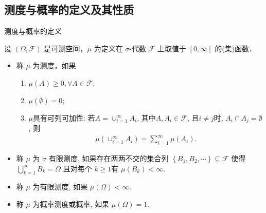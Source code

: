 \documentclass[Prob-All.tex]{subfiles}
\begin{document}










\subsection{测度与概率的定义及其性质}
\begin{frame}{测度与概率的定义}
\begin{defi}
  设 $(\Omega, \mathcal{F})$ 是可测空间，$\mu$ 为定义在 $\sigma$-代数 $\mathcal{F}$ 上取值于 $[0, \infty]$ 的(集)函数．

 \begin{itemize}[<+-|alert@+>]
 \item 称 $\mu$ 为测度，如果
 \begin{enumerate}[<+-|alert@+>][(1)]
			\item $\mu(A)\ge 0, \forall A\in \mathcal{F}$;
			\item $\mu(\emptyset)=0$;
			\item $\mu$具有可列可加性: 若$A=\cup_{i=1}^{\infty}A_i$, 其中$A, A_i\in \mathcal{F}$,  且$i\neq j$时, $A_i\cap A_j=\emptyset$,  则
			\begin{eqnarray*}
				\mu(\cup_{i=1}^{\infty}A_i)=\sum_{i=1}^{\infty}\mu(A_i).
			\end{eqnarray*}

		\end{enumerate}
 \item 称 $\mu$ 为 $\sigma$ 有限测度, 如果存在两两不交的集合列 $\left\{B_{1}, B_{2}, \cdots\right\} \subseteq \mathcal{F}$ 使得 $\bigcup_{k=1}^{\infty} B_{k}=\Omega$ 且对每个 $k \geqslant 1$有 $\mu\left(B_{k}\right)<\infty$.
 \item 称 $\mu$ 为有限测度, 如果 $\mu(\Omega)<\infty$.
 \item 称 $\mu$ 为概率测度或概率, 如果 $\mu(\Omega)=1$.
 \end{itemize}


\end{defi}

\end{frame}
\end{document}
